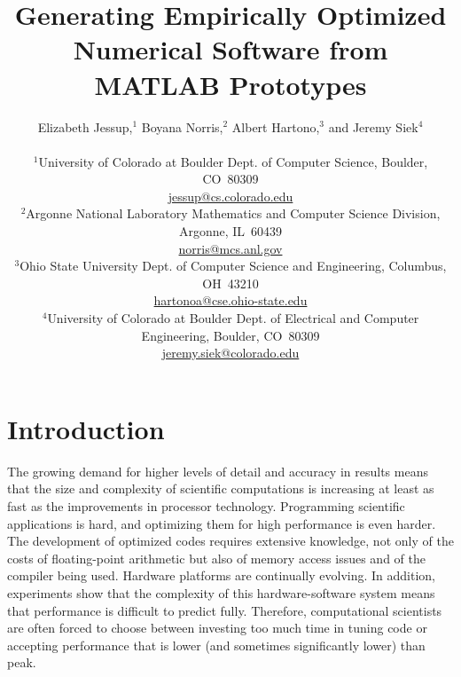 \documentclass[11pt]{article}
\title{Generating Empirically Optimized Numerical Software from MATLAB Prototypes}
\author{
Elizabeth Jessup,$^1$ Boyana Norris,$^2$ Albert Hartono,$^3$ and Jeremy Siek$^4$\\
\\
\vspace{-.05in}
{\small $^1$University of Colorado at Boulder Dept. of Computer Science, Boulder, CO~80309}\\
\vspace{-.05in}
{\small \url{jessup@cs.colorado.edu}}\\
\vspace{-.05in}
{\small $^2$Argonne National Laboratory Mathematics and Computer Science Division, Argonne, IL~60439}\\
\vspace{-.05in}
{\small \url{norris@mcs.anl.gov}}\\
\vspace{-.05in}
{\small $^3$Ohio State University Dept. of Computer Science and Engineering, Columbus, OH~43210}\\
\vspace{-.05in}
{\small \url{hartonoa@cse.ohio-state.edu}}\\
\vspace{-.05in}
{\small $^4$University of Colorado at Boulder Dept. of Electrical and Computer Engineering, Boulder, CO~80309}\\
\vspace{-.05in}
{\small \url{jeremy.siek@colorado.edu}}
}
\begin{document}
\maketitle



\doublespacing
\section{Introduction}
\label{sec:intro}


The growing demand for higher levels of detail and accuracy in results means that the size and complexity of scientific computations is increasing at least as fast as the improvements in processor technology. Programming scientific applications is hard, and optimizing them for high performance is even harder.  The development of optimized codes requires extensive knowledge, not only of the costs of floating-point arithmetic but also of  memory access issues and of the compiler being used. Hardware platforms are continually evolving. In addition, experiments show that the complexity of this  hardware-software system means that performance is difficult to predict fully.  Therefore, computational scientists are often forced to choose between investing too much time in tuning code or  accepting performance that is lower (and sometimes significantly lower) than peak.
\end{document}
